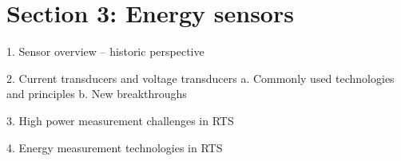 


\section{Section 3: Energy sensors}

1.	Sensor overview – historic perspective

2.	Current transducers and voltage transducers
a.	Commonly used technologies and principles
b.	New breakthroughs

3.	High power measurement challenges in RTS

4.	Energy measurement technologies in RTS 